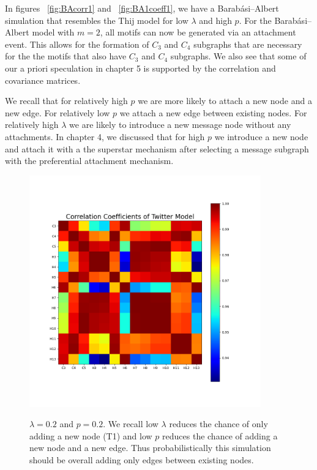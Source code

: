 
In figures ~\ref{fig:BAcorr1} and ~\ref{fig:BA1coeff1}, we have a Barabási–Albert simulation that resembles the Thij model for low $\lambda$ and high $p$. For 
the Barabási–Albert model with $m=2$, all motifs can now be generated via an attachment event.
 This allows for the formation of $C_3$ and $C_4$ subgraphs that are necessary for the
the motifs that also have $C_3$ and $C_4$ subgraphs. We also see that some of our a priori speculation
in chapter 5 is supported by the correlation and covariance matrices. 


We recall that for relatively high $p$ we are more likely to attach a new node and a new
edge. For relatively low $p$ we attach a new edge between existing nodes. For relatively
high $\lambda$ we are likely to introduce a new message node without any attachments. 
In chapter 4, we discussed that for high $p$ we introduce a new node and attach it with
a the superstar mechanism after selecting a message subgraph with the preferential
attachment mechanism.

\begin{figure}
    \includegraphics[width=10cm]{Images/CorrCoefTwitterModel020209.png}\
    \centering
    \caption{$\lambda=0.2$ and $p=0.2$. We recall low $\lambda$ reduces the chance of only adding a new node (T1)
    and low $p$ reduces the chance of adding a new node and a new edge. Thus 
    probabilistically this simulation should be overall adding only edges between existing nodes.}
\end{figure}

